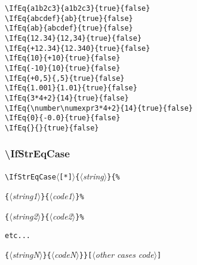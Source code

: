 \documentclass[a4paper,10pt]{article}
\newcommand\argu[1]{$\langle$\textit{#1}$\rangle$}
\newcommand\ARGU[1]{\texttt{\{}\argu{#1}\texttt{\}}}
\newcommand\arguC[1]{\texttt{[}\argu{#1}\texttt{]}}
\newcommand\etoile{$\langle$\texttt{[*]}$\rangle$}
\newcommand\styleexemple{\small\vskip4pt}
\newcommand\verbinline{\lstinline[basicstyle=\normalsize\ttfamily]}
\begin{document}
\begin{minipage}[t]{0.65\linewidth}
\begin{lstlisting}
\IfEq{a1b2c3}{a1b2c3}{true}{false}
\IfEq{abcdef}{ab}{true}{false}
\IfEq{ab}{abcdef}{true}{false}
\IfEq{12.34}{12,34}{true}{false}
\IfEq{+12.34}{12.340}{true}{false}
\IfEq{10}{+10}{true}{false}
\IfEq{-10}{10}{true}{false}
\IfEq{+0,5}{,5}{true}{false}
\IfEq{1.001}{1.01}{true}{false}
\IfEq{3*4+2}{14}{true}{false}
\IfEq{\number\numexpr3*4+2}{14}{true}{false}
\IfEq{0}{-0.0}{true}{false}
\IfEq{}{}{true}{false}
\end{lstlisting}%
\end{minipage}\hfill
\begin{minipage}[t]{0.35\linewidth}
	\styleexemple
	\par
	\par
	\par
	\par
	\par
	\par
	\par
	\par
	\par
	\par
	\par
	\par
\end{minipage}%

\subsubsection{\ttfamily\textbackslash IfStrEqCase}

\begin{minipage}{\textwidth}
	\verbinline|\IfStrEqCase|\etoile\ARGU{string}\verb|{%|\par
	\qquad\qquad\ARGU{string1}\ARGU{code1}\verb|%|\par
	\qquad\qquad\ARGU{string2}\ARGU{code2}\verb|%|\par
	\qquad\qquad\verb|etc...|\par
	\qquad\qquad\ARGU{stringN}\ARGU{codeN}\verb|}|\arguC{other cases code}
\end{minipage}
\smallskip
\end{document}
